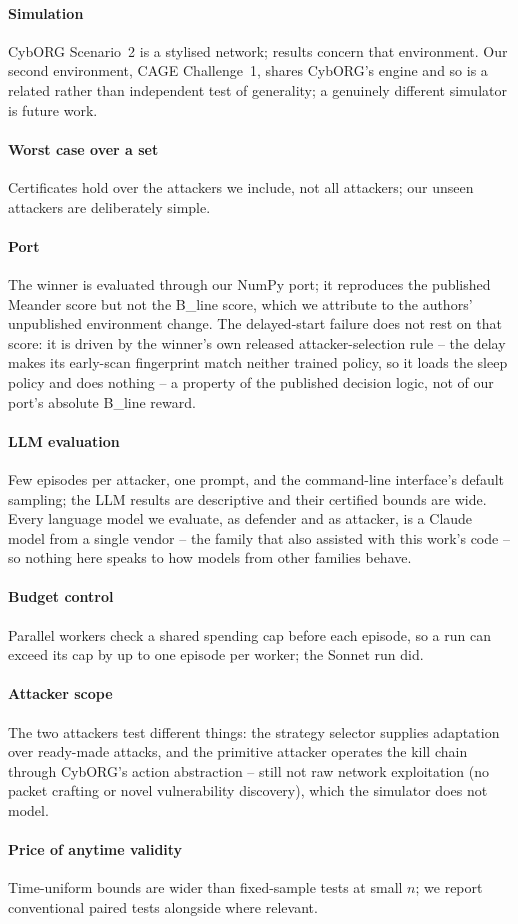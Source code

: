 \documentclass[conference,compsoc]{IEEEtran}
\begin{document}
\paragraph{Simulation} CybORG Scenario~2 is a stylised network; results concern that
environment. Our second environment, CAGE Challenge~1, shares CybORG's engine and so is a
related rather than independent test of generality; a genuinely different simulator is
future work. \paragraph{Worst case over a set} Certificates hold over the attackers we
include, not all attackers; our unseen attackers are deliberately simple. \paragraph{Port}
The winner is evaluated through our NumPy port; it reproduces the published Meander
score but not the B\_line score, which we attribute to the authors' unpublished
environment change. The delayed-start failure does not rest on that score: it is driven
by the winner's own released attacker-selection rule -- the delay makes its early-scan
fingerprint match neither trained policy, so it loads the sleep policy and does nothing --
a property of the published decision logic, not of our port's absolute B\_line reward. \paragraph{LLM evaluation} Few episodes per attacker, one prompt, and the
command-line interface's default sampling; the LLM results are descriptive and their
certified bounds are wide. Every language model we evaluate, as defender and as
attacker, is a Claude model from a single vendor -- the family that also assisted with
this work's code -- so nothing here speaks to how models from other families behave.
\paragraph{Budget control} Parallel workers check a shared spending cap before each
episode, so a run can exceed its cap by up to one episode per worker; the Sonnet run
did. \paragraph{Attacker scope} The two attackers test different things: the strategy selector
supplies adaptation over ready-made attacks, and the primitive attacker operates the kill
chain through CybORG's action abstraction -- still not raw network exploitation (no packet
crafting or novel vulnerability discovery), which the simulator does not model. \paragraph{Price of anytime validity} Time-uniform bounds are wider than fixed-sample
tests at small $n$; we report conventional paired tests alongside where relevant.
\end{document}
